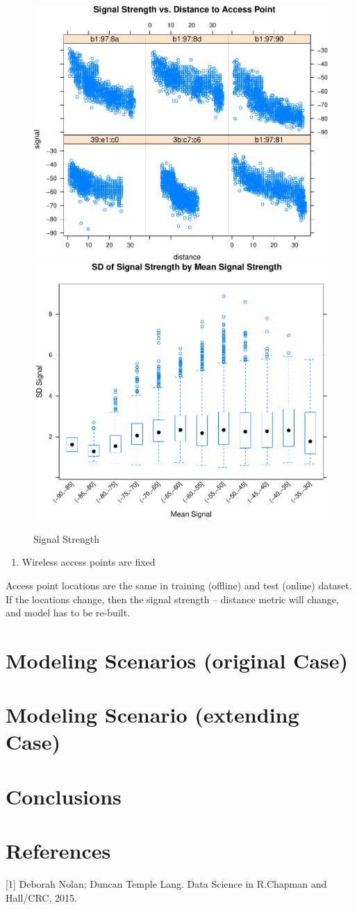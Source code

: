\documentclass[
]{article}
\providecommand{\tightlist}{%
  \setlength{\itemsep}{0pt}\setlength{\parskip}{0pt}}
\begin{document}
\begin{figure}[H]

\includegraphics[width=.49\linewidth,]{msds7333_case_study01_files/figure-latex/unnamed-chunk-7-1} \includegraphics[width=.49\linewidth,]{msds7333_case_study01_files/figure-latex/unnamed-chunk-7-2} \hfill{}

\caption{Signal Strength}\label{fig:unnamed-chunk-7}
\end{figure}

\begin{enumerate}
\def\labelenumi{\arabic{enumi}.}
\setcounter{enumi}{1}
\tightlist
\item
  Wireless access points are fixed
\end{enumerate}

Access point locations are the same in training (offline) and test
(online) dataset. If the locations change, then the signal strength --
distance metric will change, and model has to be re-built.

\hypertarget{modeling-scenarios-original-case}{%
\section{Modeling Scenarios (original
Case)}\label{modeling-scenarios-original-case}}

\hypertarget{modeling-scenario-extending-case}{%
\section{Modeling Scenario (extending
Case)}\label{modeling-scenario-extending-case}}

\hypertarget{conclusions}{%
\section{Conclusions}\label{conclusions}}

\hypertarget{references}{%
\section{References}\label{references}}

\leavevmode\hypertarget{refs}{}%
{[}1{]} Deborah Nolan; Duncan Temple Lang. Data Science in R.Chapman and
Hall/CRC, 2015.
\end{document}
